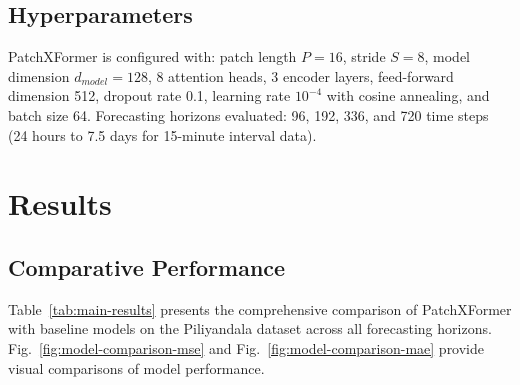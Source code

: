 \documentclass[conference]{IEEEtran}
\begin{document}
\subsection{Hyperparameters}

PatchXFormer is configured with: patch length $P=16$, stride $S=8$, model dimension $d_{model}=128$, 8 attention heads, 3 encoder layers, feed-forward dimension 512, dropout rate 0.1, learning rate $10^{-4}$ with cosine annealing, and batch size 64. Forecasting horizons evaluated: 96, 192, 336, and 720 time steps (24 hours to 7.5 days for 15-minute interval data).

\section{Results}

\subsection{Comparative Performance}

Table~\ref{tab:main-results} presents the comprehensive comparison of PatchXFormer with baseline models on the Piliyandala dataset across all forecasting horizons. Fig.~\ref{fig:model-comparison-mse} and Fig.~\ref{fig:model-comparison-mae} provide visual comparisons of model performance.

\begin{table}[ht]
\centering
\caption{Performance Comparison on Piliyandala Dataset}
\label{tab:main-results}
\end{table}
\end{document}
